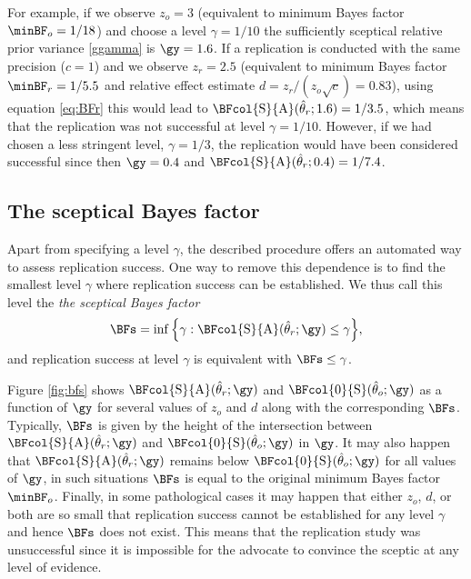 For example, if we observe $z_o = 3$ (equivalent to minimum Bayes factor
$\minBF_{o} = 1/18$) and choose a level $\gamma = 1/10$
the sufficiently sceptical relative prior variance \eqref{ggamma} is
$\gy = 1.6$. If a replication is conducted with the
same precision ($c = 1$) and we observe $z_r = 2.5$ (equivalent to
minimum Bayes factor $\minBF_{r} = 1/5.5$ and relative effect
estimate $d = z_{r}/(z_{o}\sqrt{c}) = 0.83$), using equation
\eqref{eq:BFr} this would lead to $\BFcol{\mathrm{S}}{\mathrm{A}}(\hat{\theta}_r;
1.6) = 1/3.5$, which means
that the replication was not successful at level $\gamma = 1/10$.
However, if we had chosen a less stringent level, \eg$\gamma =
1/3$, the replication would have been considered successful
since then $\gy = 0.4$ and
$\BFcol{\mathrm{S}}{\mathrm{A}}(\hat{\theta}_r; 0.4)
= 1/7.4$.

\subsection{The sceptical Bayes factor}
Apart from specifying a level $\gamma$, the described procedure offers an
automated way to assess replication success. One way to remove this dependence
is to find the smallest level $\gamma$ where replication success can be
established. We thus call this level the \emph{the sceptical Bayes factor}
\begin{align}
  \label{eq:bfs}
  \BFs
  =
  \inf
  \Big\{\gamma :
  \BFcol{\mathrm{S}}{\mathrm{A}}(\hat{\theta}_r; \gy)
  \leq \gamma\Big\},
\end{align}
and replication success at level $\gamma$ is equivalent with $\BFs \leq \gamma$.

Figure \ref{fig:bfs} shows $\BFcol{\mathrm{S}}{\mathrm{A}}(\hat{\theta}_r; \gy)$ and
$\BFcol{0}{\mathrm{S}}(\hat{\theta}_o; \gy)$ as a function of $\gy$ for several
values of $z_o$ and $d$ along with the corresponding $\BFs$. Typically, $\BFs$
is given by the height of the intersection between
$\BFcol{\mathrm{S}}{\mathrm{A}}(\hat{\theta}_r; \gy)$ and
$\BFcol{0}{\mathrm{S}}(\hat{\theta}_o; \gy)$ in $\gy$. It may also happen that
$\BFcol{\mathrm{S}}{\mathrm{A}}(\hat{\theta}_r; \gy)$ remains below
$\BFcol{0}{\mathrm{S}}(\hat{\theta}_o; \gy)$ for all values of $\gy$, in such
situations $\BFs$ is equal to the original minimum Bayes factor $\minBF_o$.
Finally, in some pathological cases it may happen that either $z_o$, $d$, or
both are so small that replication success cannot be established for any level
$\gamma$ and hence $\BFs$ does not exist. This means that the replication study
was unsuccessful since it is impossible for the advocate to convince the sceptic
at any level of evidence.


